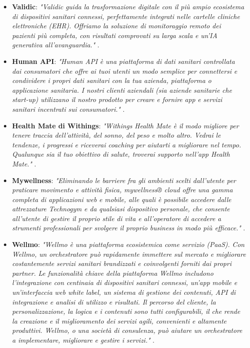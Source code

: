 \documentclass[12pt,a4paper,oneside]{report}
\begin{document}
\begin{itemize}
    \item \textbf{Validic}: \textit{"Validic guida la trasformazione digitale con il più ampio ecosistema di dispositivi sanitari connessi, perfettamente integrati nelle cartelle cliniche elettroniche (EHR). Offriamo la soluzione di monitoraggio remoto dei pazienti più completa, con risultati comprovati su larga scala e un'IA generativa all'avanguardia."} \cite{validic}.
    \item \textbf{Human API}: \textit{"Human API è una piattaforma di dati sanitari controllata dai consumatori che offre ai tuoi utenti un modo semplice per connettersi e condividere i propri dati sanitari con la tua azienda, piattaforma o applicazione sanitaria. I nostri clienti aziendali (sia aziende sanitarie che start-up) utilizzano il nostro prodotto per creare e fornire app e servizi sanitari incentrati sui consumatori."} \cite{humanapi}.
    \item \textbf{Health Mate di Withings}: \textit{"Withings Health Mate è il modo migliore per tenere traccia dell'attività, del sonno, del peso e molto altro. Vedrai le tendenze, i progressi e riceverai coaching per aiutarti a migliorare nel tempo. Qualunque sia il tuo obiettivo di salute, troverai supporto nell'app Health Mate."} \cite{withings}.
    \item \textbf{Mywellness}: \textit{"Eliminando le barriere fra gli ambienti scelti dall'utente per praticare movimento e attività fisica, mywellness® cloud offre una gamma completa di applicazioni web e mobile, alle quali è possibile accedere dalle attrezzature Technogym e da qualsiasi dispositivo personale, che consente all'utente di gestire il proprio stile di vita e all'operatore di accedere a strumenti professionali per svolgere il proprio business in modo più efficace."} \cite{mywellness}.
    \item \textbf{Wellmo}: \textit{"Wellmo è una piattaforma ecosistemica come servizio (PaaS). Con Wellmo, un orchestratore può rapidamente immettere sul mercato e migliorare costantemente servizi sanitari brandizzati e coinvolgenti forniti dai propri partner. Le funzionalità chiave della piattaforma Wellmo includono l'integrazione con centinaia di dispositivi sanitari connessi, un'app mobile e un'interfaccia web white label, un sistema di gestione dei contenuti, API di integrazione e analisi di utilizzo e risultati. Il percorso del cliente, la personalizzazione, la logica e i contenuti sono tutti configurabili, il che rende la creazione e il miglioramento dei servizi agili, convenienti e altamente produttivi. Wellmo, o una società di consulenza, può aiutare un orchestratore a implementare, migliorare e gestire i servizi."} \cite{wellmo}.

\end{itemize}
\end{document}
